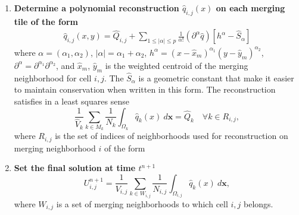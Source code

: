 \begin{enumerate}
\item \textbf{Determine a polynomial reconstruction $\hat q_{i,j}(x)$ on 
each merging tile of the form}
\begin{equation}\label{eq:q}
\begin{aligned}
    \hat q_{i,j} (x,y) = \widehat{Q}_{i,j} +  \sum_{1 \leq |\alpha| \leq p}  \frac{1}{\alpha!} (\partial^{\alpha} \hat q) [h^{\alpha}-\hat S_{\alpha}]
\end{aligned}
\end{equation}
where $\alpha = (\alpha_1, \alpha_2)$, $|\alpha| = \alpha_1 + \alpha_2$, $h^{\alpha} = (x-\hat x_m)^{\alpha_1}(y-\hat y_m)^{\alpha_2}$, $\partial^{\alpha} = \partial^{\alpha_1}\partial^{\alpha_2}$,
and $\hat x_m$, $\hat y_m$ is the weighted centroid of the merging
neighborhood for cell $i,j$. 
The $ \hat S_{\alpha}$ is a geometric
constant that make it easier to maintain conservation when written in
this form.  The reconstruction satisfies in a least squares sense
\begin{equation}\label{eq:qi}
\frac{1}{\hat{V}_{k}}\sum_{k \in M_{k}}\frac{1}{N_{k}}\int_{\Omega_{k}} \hat q_{k}(x)~d\mathbf{x} = \hat Q_{k} \quad \forall k \in R_{i,j},
\end{equation}
where $R_{i,j}$ is the set of indices of neighborhoods used for reconstruction 
on merging neighborhood $i$ of the form


\item \textbf{Set the final solution at time $t^{n+1}$}
	\begin{equation}\label{eq:final_update}
	U^{n+1}_{i,j} =  \frac{1}{V_{i,j}}\sum_{k \in W_{i,j}}\frac{1}{N_{i,j}}\int_{\Omega_{i,j}} \hat q_{k}(x)~d\mathbf{x} ,
	\end{equation}
	where $W_{i,j}$ is a set of merging neighborhoods to which cell $i,j$ belongs.
\end{enumerate}


